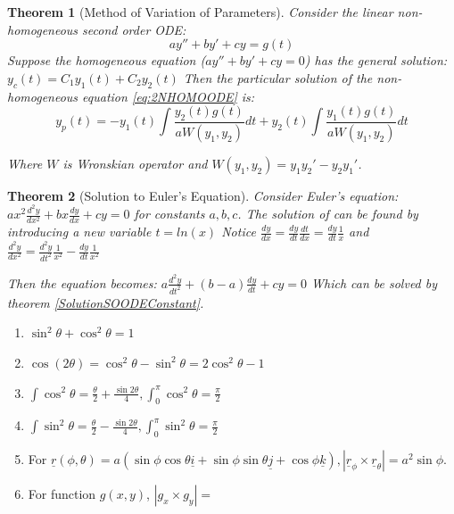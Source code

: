 \documentclass[9pt]{article}
\newtheorem{theorem}{Theorem}[subsection]
\theoremstyle{definition}
\theoremstyle{remark}
\begin{document}
\begin{theorem}[Method of Variation of Parameters]
	Consider the linear non-homogeneous second order ODE:
\begin{equation}\label{eq:2NHOMOODE}
	ay'' + by' + cy = g(t)
\end{equation}
Suppose the homogeneous equation ($ay'' + by' + cy = 0$) has the general solution:
$
	y_c(t) = C_1y_1(t) + C_2y_2(t)
$
Then the particular solution of the non-homogeneous equation \ref{eq:2NHOMOODE} is: 
\[
	y_p(t) = -y_1(t)\int \frac{y_2(t)g(t)}{aW(y_1,y_2)} dt + y_2(t)\int \frac{y_1(t)g(t)}{aW(y_1,y_2)} dt
\]

Where $W$ is Wronskian operator and 
$W(y_1,y_2) = y_1y_2' - y_2y_1'$.
\end{theorem}

\begin{theorem}[Solution to Euler's Equation]
	Consider Euler's equation:
$
	ax^2 \frac{d^2y}{dx^2} + bx \frac{dy}{dx} + cy = 0
$
for constants $a,b,c$. The solution of can be found by introducing a new variable $t = ln(x)$
Notice $ \frac{dy}{dx} = \frac{dy}{dt} \frac{dt}{dx} = \frac{dy}{dt} \frac{1}{x}$
and $ \frac{d^2y}{dx^2} = \frac{d^2y}{dt^2} \frac{1}{x^2} - \frac{dy}{dt} \frac{1}{x^2}$

Then the equation becomes:
$
	a\frac{d^2y}{dt^2} + (b-a)\frac{dy}{dt} + cy = 0
$
Which can be solved by theorem \ref{SolutionSOODEConstant}.
\end{theorem}

\begin{enumerate}
\item $\sin^2{\theta} + \cos^2{\theta} = 1$
\item $\cos(2\theta) = \cos^2{\theta} - \sin^2{\theta} = 2\cos^2{\theta} - 1$

	\item $\int \cos^2{\theta} = \frac{\theta}{2} + \frac{\sin{2\theta}}{4}, \int_0^{\pi} \cos^2{\theta} = \frac{\pi}{2} $
	\item $\int \sin^2{\theta} = \frac{\theta}{2} - \frac{\sin{2\theta}}{4},  \int_0^{\pi} \sin^2{\theta} = \frac{\pi}{2} $
	\item For $ \underline{r}(\phi, \theta) = 
		a(\sin{\phi}\cos{\theta} \underline{i} +
		\sin{\phi}\sin{\theta} \underline{j} + 
		\cos{\phi} \underline{k}), 
		|\underline{r}_{\phi} \times \underline{r}_{\theta}| = 
		a^2\sin{\phi}$.
	\item For function $g(x,y)$, $|g_x \times g_y| = $ 


\end{enumerate}
\end{document}
